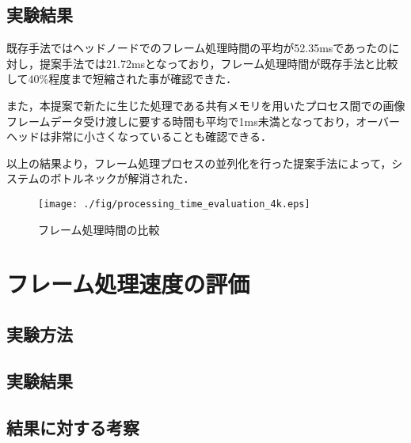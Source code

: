 \subsection{実験結果}

既存手法ではヘッドノードでのフレーム処理時間の平均が52.35msであったのに対し，提案手法では21.72msとなっており，フレーム処理時間が既存手法と比較して40\%程度まで短縮された事が確認できた．

また，本提案で新たに生じた処理である共有メモリを用いたプロセス間での画像フレームデータ受け渡しに要する時間も平均で1ms未満となっており，オーバーヘッドは非常に小さくなっていることも確認できる．

以上の結果より，フレーム処理プロセスの並列化を行った提案手法によって，システムのボトルネックが解消された．

\begin{figure}[H]
    \hspace*{\fill}
    \texttt{[image: ./fig/processing\_time\_evaluation\_4k.eps]}
    \hspace*{\fill}
    \caption{フレーム処理時間の比較}
   \end{figure}

\section{フレーム処理速度の評価}



\subsection{実験方法}

\subsection{実験結果}

\subsection{結果に対する考察}